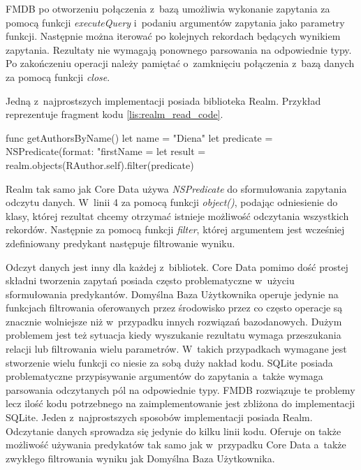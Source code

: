 FMDB po otworzeniu połączenia z~bazą umożliwia wykonanie zapytania za pomocą funkcji \textit{executeQuery} i~podaniu argumentów zapytania jako parametry funkcji. Następnie można iterować po kolejnych rekordach będących wynikiem zapytania. Rezultaty nie wymagają ponownego parsowania na odpowiednie typy. Po zakończeniu operacji należy pamiętać o~zamknięciu połączenia z~bazą danych za pomocą funkcji \textit{close}. 

Jedną z~najprostszych implementacji posiada biblioteka Realm. Przykład reprezentuje fragment kodu \ref{lis:realm_read_code}.

\begin{code}[
		language=swift,
		caption={Przykład odczytu danych Realm},
		label={lis:realm_read_code},
	]
    func getAuthorsByName() {
        let name = "Diena"
        let predicate = NSPredicate(format: "firstName = %
        let result = realm.objects(RAuthor.self).filter(predicate)
    }
\end{code}

Realm tak samo jak Core Data używa \textit{NSPredicate} do sformułowania zapytania odczytu danych. W~linii 4 za pomocą funkcji \textit{object()}, podając odniesienie do klasy, której rezultat chcemy otrzymać istnieje możliwość odczytania wszystkich rekordów. Następnie za pomocą funkcji \textit{filter}, której argumentem jest wcześniej zdefiniowany predykant następuje filtrowanie wyniku. 

Odczyt danych jest inny dla każdej z~bibliotek. Core Data pomimo dość prostej składni tworzenia zapytań posiada często problematyczne w~użyciu sformułowania predykantów. Domyślna Baza Użytkownika operuje jedynie na funkcjach filtrowania oferowanych przez środowisko przez co często operacje są znacznie wolniejsze niż w~przypadku innych rozwiązań bazodanowych. Dużym problemem jest też sytuacja kiedy wyszukanie rezultatu wymaga przeszukania relacji lub filtrowania wielu parametrów. W~takich przypadkach wymagane jest stworzenie wielu funkcji co niesie za sobą duży nakład kodu. SQLite posiada problematyczne przypisywanie argumentów do zapytania a~także wymaga parsowania odczytanych pól na odpowiednie typy. FMDB rozwiązuje te problemy lecz ilość kodu potrzebnego na zaimplementowanie jest zbliżona do implementacji SQLite. Jeden z~najprostszych sposobów implementacji posiada Realm. Odczytanie danych sprowadza się jedynie do kilku linii kodu. Oferuje on także możliwość używania predykatów tak samo jak w~przypadku Core Data a~także zwykłego filtrowania wyniku jak Domyślna Baza Użytkownika.


